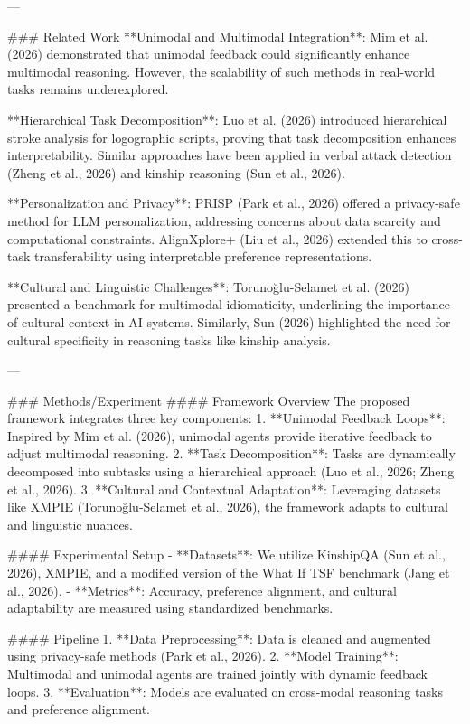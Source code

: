 ---

### Related Work  
**Unimodal and Multimodal Integration**: Mim et al. (2026) demonstrated that unimodal feedback could significantly enhance multimodal reasoning. However, the scalability of such methods in real-world tasks remains underexplored.  

**Hierarchical Task Decomposition**: Luo et al. (2026) introduced hierarchical stroke analysis for logographic scripts, proving that task decomposition enhances interpretability. Similar approaches have been applied in verbal attack detection (Zheng et al., 2026) and kinship reasoning (Sun et al., 2026).  

**Personalization and Privacy**: PRISP (Park et al., 2026) offered a privacy-safe method for LLM personalization, addressing concerns about data scarcity and computational constraints. AlignXplore+ (Liu et al., 2026) extended this to cross-task transferability using interpretable preference representations.  

**Cultural and Linguistic Challenges**: Torunoğlu-Selamet et al. (2026) presented a benchmark for multimodal idiomaticity, underlining the importance of cultural context in AI systems. Similarly, Sun (2026) highlighted the need for cultural specificity in reasoning tasks like kinship analysis.  

---

### Methods/Experiment  
#### Framework Overview  
The proposed framework integrates three key components:  
1. **Unimodal Feedback Loops**: Inspired by Mim et al. (2026), unimodal agents provide iterative feedback to adjust multimodal reasoning.  
2. **Task Decomposition**: Tasks are dynamically decomposed into subtasks using a hierarchical approach (Luo et al., 2026; Zheng et al., 2026).  
3. **Cultural and Contextual Adaptation**: Leveraging datasets like XMPIE (Torunoğlu-Selamet et al., 2026), the framework adapts to cultural and linguistic nuances.  

#### Experimental Setup  
- **Datasets**: We utilize KinshipQA (Sun et al., 2026), XMPIE, and a modified version of the What If TSF benchmark (Jang et al., 2026).  
- **Metrics**: Accuracy, preference alignment, and cultural adaptability are measured using standardized benchmarks.  

#### Pipeline  
1. **Data Preprocessing**: Data is cleaned and augmented using privacy-safe methods (Park et al., 2026).  
2. **Model Training**: Multimodal and unimodal agents are trained jointly with dynamic feedback loops.  
3. **Evaluation**: Models are evaluated on cross-modal reasoning tasks and preference alignment.  

